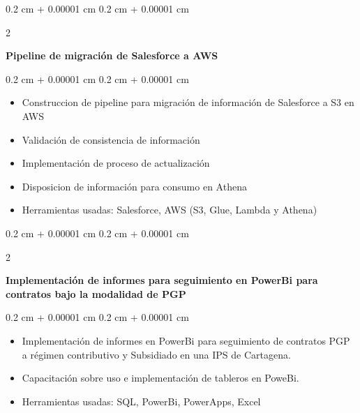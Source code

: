 \documentclass[10pt, letterpaper]{article}
\newenvironment{highlights}{
    \begin{itemize}[
        topsep=0.10 cm,
        parsep=0.10 cm,
        partopsep=0pt,
        itemsep=0pt,
        leftmargin=0.4 cm + 10pt
    ]
}{
    \end{itemize}
} %
\newenvironment{onecolentry}{
    \begin{adjustwidth}{
        0.2 cm + 0.00001 cm
    }{
        0.2 cm + 0.00001 cm
    }
}{
    \end{adjustwidth}
} %
\newenvironment{twocolentry}[2][]{
    \onecolentry
    \def\secondColumn{#2}
    \setcolumnwidth{\fill, 4.5 cm}
    \begin{paracol}{2}
}{
    \switchcolumn \raggedleft \secondColumn
    \end{paracol}
    \endonecolentry
} %
\let\hrefWithoutArrow\href
\renewcommand{\href}[2]{\hrefWithoutArrow{#1}{\ifthenelse{\equal{#2}{}}{ }{#2 }\raisebox{.15ex}{\footnotesize \faExternalLink*}}}
\begin{document}
        
        \begin{twocolentry}{}
            \textbf{Pipeline de migración de Salesforce a AWS}
        \end{twocolentry}
        \vspace{0.10 cm}
        \begin{onecolentry}
            \begin{highlights}
                \item Construccion de pipeline para migración de información de Salesforce a S3 en AWS
                \item Validación de consistencia de información
                \item Implementación de proceso de actualización
                \item Disposicion de información para consumo en Athena
                \item Herramientas usadas: Salesforce, AWS (S3, Glue, Lambda y Athena)
            \end{highlights}
        \end{onecolentry}
        \vspace{0.2 cm}

        \begin{twocolentry}{
        \color{black}{\footnotesize\faGithub}\hspace*{0.05cm} \textit{\href{https://github.com/dherrerambo/Capacitacion_PowerBi}{Power Bi}}}
            \textbf{Implementación de informes para seguimiento en PowerBi para contratos bajo la modalidad de PGP}
        \end{twocolentry}
        \vspace{0.10 cm}
        \begin{onecolentry}
            \begin{highlights}
                \item Implementación de informes en PowerBi para seguimiento de contratos PGP a régimen contributivo y Subsidiado en una IPS de Cartagena.
                \item Capacitación sobre uso e implementación de tableros en PoweBi.
                \item Herramientas usadas: SQL, PowerBi, PowerApps, Excel
            \end{highlights}
        \end{onecolentry}
        \vspace{0.2 cm}
\end{document}
